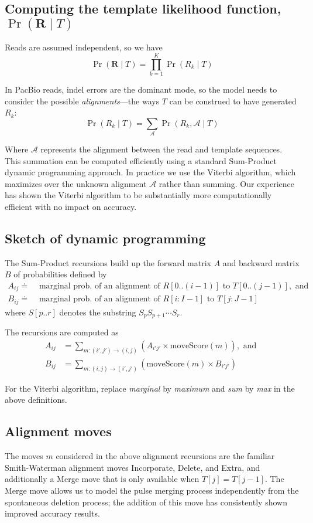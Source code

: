 \documentclass[11pt]{article}
\begin{document}
\subsection{Computing the template likelihood function, $\Pr(\mathbf{R} \mid T)$}
Reads are assumed independent, so we have
$$\Pr(\mathbf{R} \mid T) = \prod_{k=1}^{K}\Pr(R_k \mid T)$$

In PacBio reads, indel errors are the dominant mode, so the model needs to consider the possible \emph{alignments}---the ways $T$ can be construed to have generated $R_k$:
$$\Pr(R_k \mid T) = \sum_\mathcal{A} \Pr(R_k, \mathcal{A} \mid T) $$

Where $\mathcal{A}$ represents the alignment between the read and template sequences. This summation can be computed efficiently using a standard Sum-Product dynamic programming approach.  In practice we use the Viterbi algorithm, which maximizes over the unknown alignment $\mathcal{A}$ rather than summing. Our experience has shown the Viterbi algorithm to be substantially more computationally efficient with no impact on accuracy.

\subsection{Sketch of dynamic programming}
The Sum-Product recursions build up the forward matrix $A$ and backward matrix $B$ of probabilities defined by
\begin{align}
  A_{ij} \doteq & \text{ marginal prob. of an alignment of $R[0..(i-1)]$ to $T[0..(j-1)]$}, \text{ and } \\
  B_{ij} \doteq & \text{ marginal prob. of an alignment of $R[i:I-1]$ to $T[j:J-1]$}
\end{align}
where $S[p..r]$ denotes the substring $S_p S_{p+1} \cdots S_r$.

The recursions are computed as
\begin{align}
   A_{ij} &= \sum_{m: (i',j') \to (i, j)}   (A_{i'j'} \times \mathrm{moveScore}(m)), \text{ and } \\
   B_{ij} &= \sum_{m: (i, j)  \to (i', j')} (\mathrm{moveScore}(m) \times B_{i'j'})
\end{align}

For the Viterbi algorithm, replace \emph{marginal} by \emph{maximum}
and \emph{sum} by \emph{max} in the above definitions.

\subsection{Alignment moves}
The moves $m$ considered in the above alignment recursions are the familiar Smith-Waterman alignment moves \textsf{Incorporate}, \textsf{Delete}, and \textsf{Extra}, and additionally a \textsf{Merge} move that is only available when $T[j] = T[j-1]$.  The \textsf{Merge} move allows us to model the pulse merging process independently from the spontaneous deletion process; the addition of this move has consistently shown improved accuracy results.
\end{document}
